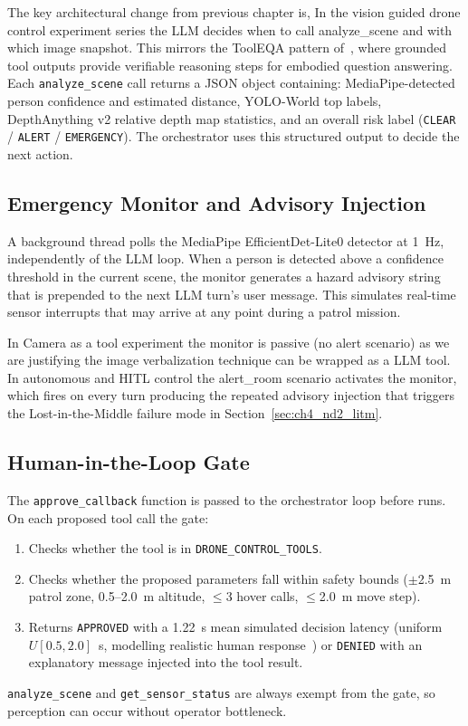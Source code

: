 The key architectural change from previous chapter is, In the vision guided drone control experiment series the LLM decides when to call analyze\_scene and with which image snapshot. This mirrors the ToolEQA pattern of~\citet{embodiedqa2025}, where grounded tool outputs
provide verifiable reasoning steps for embodied question answering.  
Each \texttt{analyze\_scene} call returns a JSON object containing: MediaPipe-detected person
confidence and estimated distance, YOLO-World top labels, DepthAnything v2 relative depth map statistics, and an overall risk label (\texttt{CLEAR} / \texttt{ALERT} / \texttt{EMERGENCY}).
The orchestrator uses this structured output to decide the next action.

\subsection{Emergency Monitor and Advisory Injection}
\label{sec:ch4_proposed_monitor}

A background thread polls the MediaPipe EfficientDet-Lite0 detector at 1~Hz, independently  of the LLM loop.  
When a person is detected above a confidence threshold in the current scene, the monitor generates a hazard advisory string that is prepended to the next LLM
turn's user message.  
This simulates real-time sensor interrupts that may arrive at any point during a patrol mission.

In Camera as a tool experiment the monitor is passive (no alert scenario) as we are justifying the image verbalization technique can be wrapped as a LLM tool.  In autonomous and HITL control the alert\_room scenario
activates the monitor, which fires on every turn producing the repeated advisory injection that triggers the Lost-in-the-Middle failure mode in Section~\ref{sec:ch4_nd2_litm}.

\subsection{Human-in-the-Loop Gate}
\label{sec:ch4_proposed_hitl}

The \texttt{approve\_callback} function is passed to the orchestrator loop before runs.
On each proposed tool call the gate:
\begin{enumerate}
  \item Checks whether the tool is in \texttt{DRONE\_CONTROL\_TOOLS}.
  \item Checks whether the proposed parameters fall within safety bounds
    ($\pm$2.5~m patrol zone, 0.5--2.0~m altitude, $\leq$3 hover calls, $\leq$2.0~m
    move step).
  \item Returns \texttt{APPROVED} with a 1.22~s mean simulated decision latency (uniform $U[0.5, 2.0]$~s, modelling realistic human response~\cite{chen2018humanperformance}) or \texttt{DENIED} with an explanatory message injected into the tool result.
\end{enumerate}
\texttt{analyze\_scene} and \texttt{get\_sensor\_status} are always exempt from the gate, so perception can occur without operator bottleneck.

